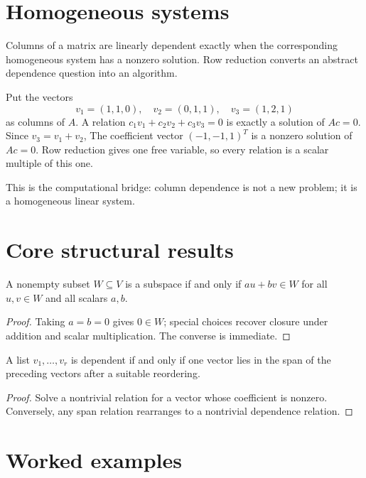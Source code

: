 \section{Homogeneous systems}
Columns of a matrix are linearly dependent exactly when the corresponding homogeneous system has a nonzero solution. Row reduction converts an abstract dependence question into an algorithm.


\begin{example}\label{ex:i02-expand-03}
Put the vectors
\[
v_1=(1,1,0),\quad v_2=(0,1,1),\quad v_3=(1,2,1)
\]
as columns of \(A\). A relation \(c_1v_1+c_2v_2+c_3v_3=0\) is exactly a
solution of \(Ac=0\). Since \(v_3=v_1+v_2\),
The coefficient vector \((-1,-1,1)^T\) is a nonzero solution of \(Ac=0\).
Row reduction gives one free variable, so every relation is a scalar multiple
of this one.

This is the computational bridge: column dependence is not a new problem; it is
a homogeneous linear system.
\end{example}
\section{Core structural results}

\begin{theorem}\label{thm:i02-01}
A nonempty subset $W\subseteq V$ is a subspace if and only if $au+bv\in W$ for all $u,v\in W$ and all scalars $a,b$.
\begin{proof}
Taking $a=b=0$ gives $0\in W$; special choices recover closure under addition and scalar multiplication. The converse is immediate.
\end{proof}
\end{theorem}

\begin{theorem}\label{thm:i02-02}
A list $v_1,\dots,v_r$ is dependent if and only if one vector lies in the span of the preceding vectors after a suitable reordering.
\begin{proof}
Solve a nontrivial relation for a vector whose coefficient is nonzero. Conversely, any span relation rearranges to a nontrivial dependence relation.
\end{proof}
\end{theorem}

\section{Worked examples}

